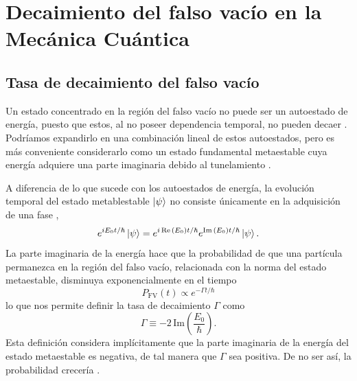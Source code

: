 \chapter{Decaimiento del falso vacío en la Mecánica Cuántica} \label{cap:falso_vacio_qm}



\section{Tasa de decaimiento del falso vacío}

Un estado concentrado en la región del falso vacío no puede ser un autoestado de energía, puesto que estos, al no poseer dependencia temporal, no pueden decaer \cite{andreassen2017precision}. Podríamos expandirlo en una combinación lineal de estos autoestados, pero es más conveniente considerarlo como un estado fundamental metaestable cuya energía adquiere una parte imaginaria debido al tunelamiento  \cite{weinberg2012classical, paranjape2017theory, rubakov2009classical}. 

A diferencia de lo que sucede con los autoestados de energía, la evolución temporal del estado metablestable $\ket{\psi}$ no consiste únicamente en la adquisición de una fase \cite{kleinert2009path},
\begin{equation}
e^{iE_0 t/\hbar}\ket{\psi} = e^{i\Re\qty(E_0) t/\hbar}e^{\Im\qty(E_0) t/\hbar}\ket{\psi}.
\end{equation}
La parte imaginaria de la energía hace que la probabilidad de que una partícula permanezca en la región del falso vacío, relacionada con la norma del estado metaestable, disminuya exponencialmente en el tiempo 
\begin{equation} \label{eq:prob}
P_{\text{FV}}(t) \propto e^{-\Gamma t/\hbar}
\end{equation}
lo que nos permite definir la tasa de decaimiento $\Gamma$ como
\begin{equation}\label{eq:gammaE}
\Gamma \equiv -2 \, \mathrm{Im}\left(\frac{E_0}{\hbar}\right).
\end{equation} 
Esta definición considera implícitamente que la parte imaginaria de la energía del estado metaestable es negativa, de tal manera que $\Gamma$ sea positiva. De no ser así, la probabilidad crecería \cite{kleinert2009path}.%

